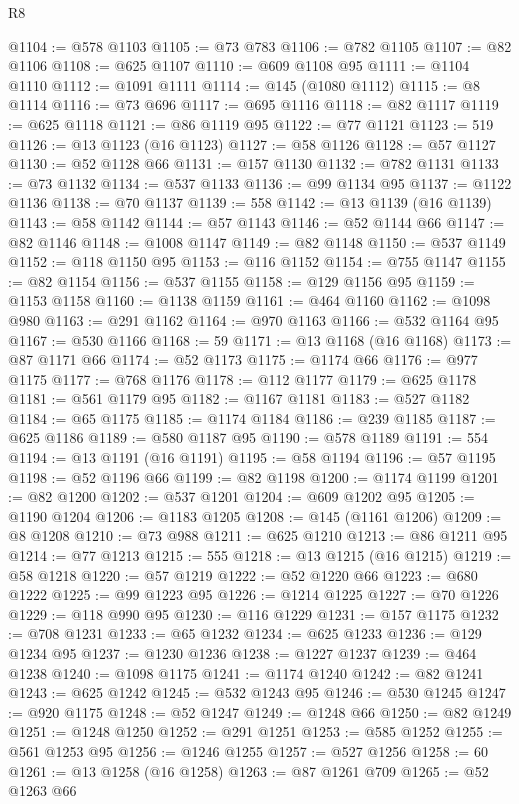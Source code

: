 \begin{lexlean}{R8}
\begin{coremodule}
@1104 := @578 @1103
@1105 := @73 @783
@1106 := @782 @1105
@1107 := @82 @1106
@1108 := @625 @1107
@1110 := @609 @1108 @95
@1111 := @1104 @1110
@1112 := @1091 @1111
@1114 := @145 (@1080 @1112)
@1115 := @8 @1114
@1116 := @73 @696
@1117 := @695 @1116
@1118 := @82 @1117
@1119 := @625 @1118
@1121 := @86 @1119 @95
@1122 := @77 @1121
@1123 := 519
@1126 := @13 @1123 (@16 @1123)
@1127 := @58 @1126
@1128 := @57 @1127
@1130 := @52 @1128 @66
@1131 := @157 @1130
@1132 := @782 @1131
@1133 := @73 @1132
@1134 := @537 @1133
@1136 := @99 @1134 @95
@1137 := @1122 @1136
@1138 := @70 @1137
@1139 := 558
@1142 := @13 @1139 (@16 @1139)
@1143 := @58 @1142
@1144 := @57 @1143
@1146 := @52 @1144 @66
@1147 := @82 @1146
@1148 := @1008 @1147
@1149 := @82 @1148
@1150 := @537 @1149
@1152 := @118 @1150 @95
@1153 := @116 @1152
@1154 := @755 @1147
@1155 := @82 @1154
@1156 := @537 @1155
@1158 := @129 @1156 @95
@1159 := @1153 @1158
@1160 := @1138 @1159
@1161 := @464 @1160
@1162 := @1098 @980
@1163 := @291 @1162
@1164 := @970 @1163
@1166 := @532 @1164 @95
@1167 := @530 @1166
@1168 := 59
@1171 := @13 @1168 (@16 @1168)
@1173 := @87 @1171 @66
@1174 := @52 @1173
@1175 := @1174 @66
@1176 := @977 @1175
@1177 := @768 @1176
@1178 := @112 @1177
@1179 := @625 @1178
@1181 := @561 @1179 @95
@1182 := @1167 @1181
@1183 := @527 @1182
@1184 := @65 @1175
@1185 := @1174 @1184
@1186 := @239 @1185
@1187 := @625 @1186
@1189 := @580 @1187 @95
@1190 := @578 @1189
@1191 := 554
@1194 := @13 @1191 (@16 @1191)
@1195 := @58 @1194
@1196 := @57 @1195
@1198 := @52 @1196 @66
@1199 := @82 @1198
@1200 := @1174 @1199
@1201 := @82 @1200
@1202 := @537 @1201
@1204 := @609 @1202 @95
@1205 := @1190 @1204
@1206 := @1183 @1205
@1208 := @145 (@1161 @1206)
@1209 := @8 @1208
@1210 := @73 @988
@1211 := @625 @1210
@1213 := @86 @1211 @95
@1214 := @77 @1213
@1215 := 555
@1218 := @13 @1215 (@16 @1215)
@1219 := @58 @1218
@1220 := @57 @1219
@1222 := @52 @1220 @66
@1223 := @680 @1222
@1225 := @99 @1223 @95
@1226 := @1214 @1225
@1227 := @70 @1226
@1229 := @118 @990 @95
@1230 := @116 @1229
@1231 := @157 @1175
@1232 := @708 @1231
@1233 := @65 @1232
@1234 := @625 @1233
@1236 := @129 @1234 @95
@1237 := @1230 @1236
@1238 := @1227 @1237
@1239 := @464 @1238
@1240 := @1098 @1175
@1241 := @1174 @1240
@1242 := @82 @1241
@1243 := @625 @1242
@1245 := @532 @1243 @95
@1246 := @530 @1245
@1247 := @920 @1175
@1248 := @52 @1247
@1249 := @1248 @66
@1250 := @82 @1249
@1251 := @1248 @1250
@1252 := @291 @1251
@1253 := @585 @1252
@1255 := @561 @1253 @95
@1256 := @1246 @1255
@1257 := @527 @1256
@1258 := 60
@1261 := @13 @1258 (@16 @1258)
@1263 := @87 @1261 @709
@1265 := @52 @1263 @66

\end{coremodule}
\end{lexlean}
